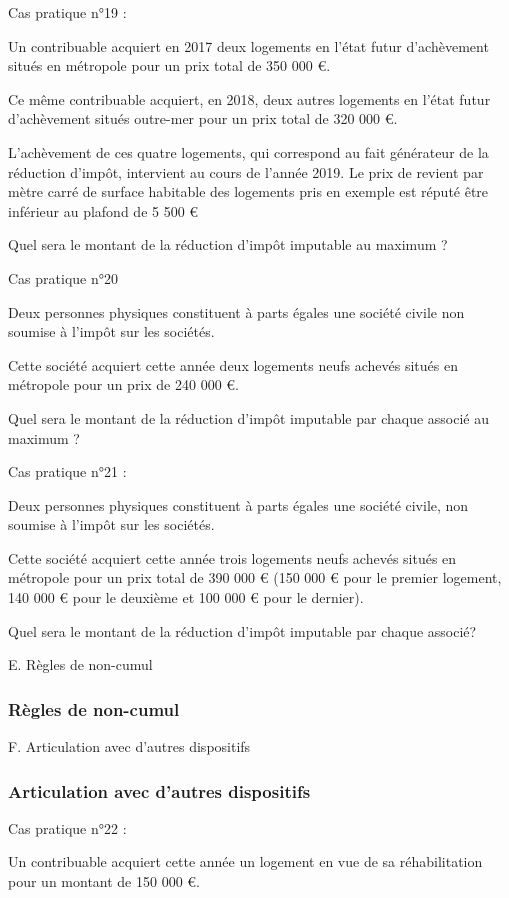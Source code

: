 			Cas pratique n°19 :

			Un contribuable acquiert en 2017 deux logements en l'état futur d'achèvement situés en métropole pour un prix total de 350 000 €.

			Ce même contribuable acquiert, en 2018, deux autres logements en l'état futur d'achèvement situés outre-mer pour un prix total de 320 000 €.

			L'achèvement de ces quatre logements, qui correspond au fait générateur de la réduction d'impôt, intervient au cours de l'année 2019. Le prix de revient par mètre carré de surface habitable des logements pris en exemple est réputé être inférieur au plafond de 5 500 €

			Quel sera le montant de la réduction d'impôt imputable au maximum ?

Cas pratique n°20

Deux personnes physiques constituent à parts égales une société civile non soumise à l'impôt sur les sociétés.

Cette société acquiert cette année deux logements neufs achevés situés en métropole pour un prix de 240 000 €.

Quel sera le montant de la réduction d'impôt imputable par chaque associé au maximum ?

Cas pratique n°21 :

Deux personnes physiques constituent à parts égales une société civile, non soumise à l'impôt sur les sociétés.

Cette société acquiert cette année trois logements neufs achevés situés en métropole pour un prix total de 390 000 € (150 000 € pour le premier logement, 140 000 € pour le deuxième et 100 000 € pour le dernier).

Quel sera le montant de la réduction d'impôt imputable par chaque associé?


E. Règles de non-cumul
			\subsubsection{Règles de non-cumul}


F. Articulation avec d'autres dispositifs
			\subsubsection{Articulation avec d'autres dispositifs}


			Cas pratique n°22 :

			Un contribuable acquiert cette année un logement en vue de sa réhabilitation pour un montant de 150 000 €.

